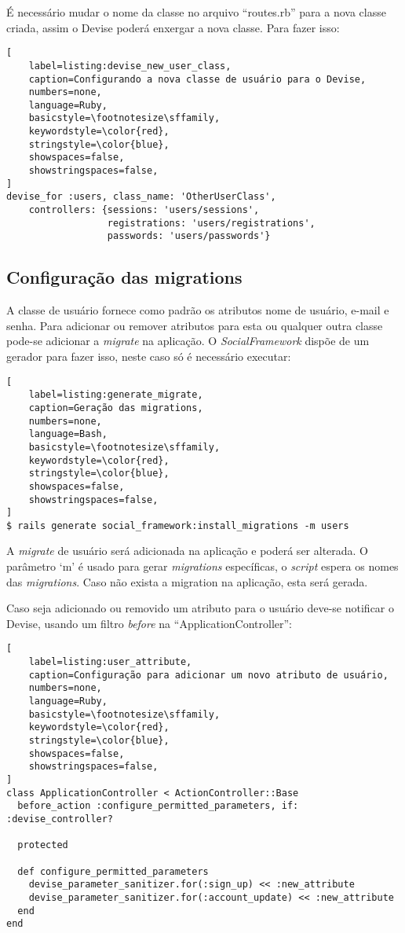 É necessário mudar o nome da classe no arquivo ``routes.rb'' para a nova classe criada, assim o Devise poderá enxergar a nova classe. Para fazer isso:

\begin{lstlisting}[
    label=listing:devise_new_user_class,
    caption=Configurando a nova classe de usuário para o Devise,
    numbers=none,
    language=Ruby,
    basicstyle=\footnotesize\sffamily,
    keywordstyle=\color{red},
    stringstyle=\color{blue},
    showspaces=false,
    showstringspaces=false,
]
devise_for :users, class_name: 'OtherUserClass',
    controllers: {sessions: 'users/sessions',
                  registrations: 'users/registrations',
                  passwords: 'users/passwords'}
\end{lstlisting}

\subsection{Configuração das migrations}
\label{configuracao_das_migrations}

A classe de usuário fornece como padrão os atributos nome de usuário, e-mail e senha. Para adicionar ou remover atributos para esta ou qualquer outra classe pode-se adicionar a \textit{migrate} na aplicação. O \textit{SocialFramework} dispõe de um gerador para fazer isso, neste caso só é necessário executar:

\begin{lstlisting}[
    label=listing:generate_migrate,
    caption=Geração das migrations,
    numbers=none,
    language=Bash,
    basicstyle=\footnotesize\sffamily,
    keywordstyle=\color{red},
    stringstyle=\color{blue},
    showspaces=false,
    showstringspaces=false,
]
$ rails generate social_framework:install_migrations -m users
\end{lstlisting}

A \textit{migrate} de usuário será adicionada na aplicação e poderá ser alterada. O parâmetro `m' é usado para gerar \textit{migrations} específicas, o \textit{script} espera os nomes das \textit{migrations}. Caso não exista a migration na aplicação, esta será gerada.

Caso seja adicionado ou removido um atributo para o usuário deve-se notificar o Devise, usando um filtro \textit{before} na ``ApplicationController'':

\begin{lstlisting}[
    label=listing:user_attribute,
    caption=Configuração para adicionar um novo atributo de usuário,
    numbers=none,
    language=Ruby,
    basicstyle=\footnotesize\sffamily,
    keywordstyle=\color{red},
    stringstyle=\color{blue},
    showspaces=false,
    showstringspaces=false,
]
class ApplicationController < ActionController::Base
  before_action :configure_permitted_parameters, if: :devise_controller?

  protected

  def configure_permitted_parameters
    devise_parameter_sanitizer.for(:sign_up) << :new_attribute
    devise_parameter_sanitizer.for(:account_update) << :new_attribute
  end
end
\end{lstlisting}

